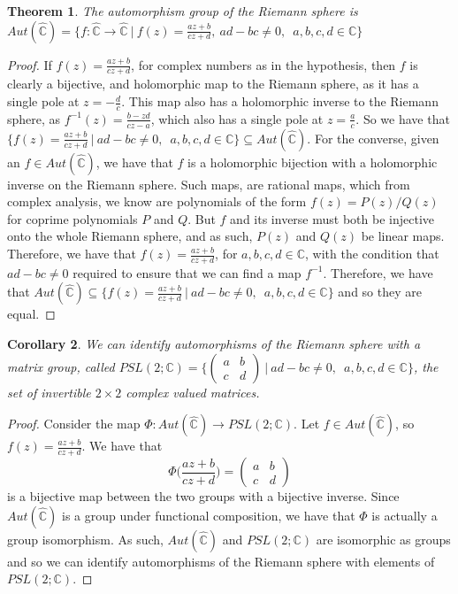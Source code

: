 \documentclass[11pt]{report}
\newtheorem{thm}{Theorem}[section]
\newtheorem{cor}[thm]{Corollary}
\theoremstyle{definition}
\begin{document}
\begin{thm}\label{AutSphere}
  The automorphism group of the Riemann sphere is ~\\
  $Aut(\widehat{\mathbb{C}}) = \bigl\{f:\widehat{\mathbb{C}} \rightarrow \widehat{\mathbb{C}} \ \vert \ f(z) = \frac{az+b}{cz+d}, \ ad-bc \neq 0, \enspace a, b, c ,d \in \mathbb{C}\bigr\}$
\end{thm}
\begin{proof}
  If $f(z)=\frac{az+b}{cz+d}$, for complex numbers as in the hypothesis, then $f$ is clearly a bijective, and holomorphic map to the Riemann sphere, as it has a single pole at $z = -\frac{d}{c}$. This map also has a holomorphic inverse to the Riemann sphere, as $f^{-1}(z) = \frac{b-zd}{cz-a}$, which also has a single pole at $z=\frac{a}{c}$. So we have that $\bigl\{f(z) = \frac{az+b}{cz+d}\ \vert \ ad-bc \neq 0, \enspace a, b, c ,d \in \mathbb{C}\bigr\} \subseteq Aut(\widehat{\mathbb{C}})$. For the converse, given an $f \in Aut(\widehat{\mathbb{C}})$, we have that $f$ is a holomorphic bijection with a holomorphic inverse on the Riemann sphere. Such maps, are rational maps, which from complex analysis, we know are polynomials of the form $f(z)=P(z)/Q(z)$ for coprime polynomials $P$ and $Q$. But $f$ and its inverse must both be injective onto the whole Riemann sphere, and as such, $P(z)$ and $Q(z)$ be linear maps. Therefore, we have that $f(z)=\frac{az+b}{cz+d}$, for $a,b,c,d \in \mathbb{C}$, with the condition that $ad-bc \neq 0$ required to ensure that we can find a map $f^{-1}$. Therefore, we have that $Aut(\widehat{\mathbb{C}}) \subseteq \bigl\{f(z) = \frac{az+b}{cz+d}\ \vert \ ad-bc \neq 0, \enspace a, b, c ,d \in \mathbb{C}\bigr\}$ and so they are equal.
\end{proof} 
\begin{cor}
  We can identify automorphisms of the Riemann sphere with a matrix group, called $PSL(2;\mathbb{C}) = \Bigg\{ \begin{pmatrix} a & b\\ c & d \end{pmatrix} \ \Bigg\vert \ ad-bc \neq 0, \enspace a, b, c ,d \in \mathbb{C}\Bigg\}$, the set of invertible $2\times 2$ complex valued matrices. 
\end{cor}
\begin{proof}
  Consider the map $\Phi : Aut(\widehat{\mathbb{C}}) \rightarrow PSL(2;\mathbb{C})$. Let $f \in Aut(\widehat{\mathbb{C}})$, so $f(z) = \frac{az+b}{cz+d}$. We have that \[\Phi\Big(\frac{az+b}{cz+d}\Big) = \begin{pmatrix} a & b\\ c & d \end{pmatrix}\] is a bijective map between the two groups with a bijective inverse. Since $Aut(\widehat{\mathbb{C}})$ is a group under functional composition, we have that $\Phi$ is actually a group isomorphism. As such, $Aut(\widehat{\mathbb{C}})$ and $PSL(2;\mathbb{C})$ are isomorphic as groups and so we can identify automorphisms of the Riemann sphere with elements of $PSL(2;\mathbb{C})$. 
\end{proof}
\end{document}
